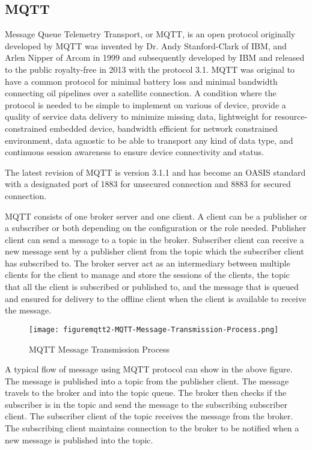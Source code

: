 \subsection{MQTT}
Message Queue Telemetry Transport, or MQTT, is an open protocol originally developed by MQTT was invented by Dr. Andy Stanford-Clark of IBM, and Arlen Nipper of Arcom in 1999 and subsequently developed by IBM and released to the public royalty-free in 2013 with the protocol 3.1. MQTT was original to have a common protocol for minimal battery loss and minimal bandwidth connecting oil pipelines over a satellite connection. A condition where the protocol is needed to be simple to implement on various of device, provide a quality of service data delivery to minimize missing data, lightweight for resource-constrained embedded device, bandwidth efficient for network constrained environment, data agnostic to be able to transport any kind of data type, and continuous session awareness to ensure device connectivity and status\cite{mqtt}.

The latest revision of MQTT is version 3.1.1 and has become an OASIS standard with a designated port of 1883 for unsecured connection and 8883 for secured connection.

MQTT consists of one broker server and one client. A client can be a publisher or a subscriber or both depending on the configuration or the role needed. Publisher client can send a message to a topic in the broker. Subscriber client can receive a new message sent by a publisher client from the topic which the subscriber client has subscribed to. The broker server act as an intermediary between multiple clients for the client to manage and store the sessions of the clients, the topic that all the client is subscribed or published to, and the message that is queued and ensured for delivery to the offline client when the client is available to receive the message. 

\begin{figure}[h]
\centering
\texttt{[image: figuremqtt2-MQTT-Message-Transmission-Process.png]}
\caption{MQTT Message Transmission Process \protect\cite{mqtt}}
\label{fig:mqtt2}
\end{figure}

A typical flow of message using MQTT protocol can show in the above figure. The message is published into a topic from the publisher client. The message travels to the broker and into the topic queue. The broker then checks if the subscriber is in the topic and send the message to the subscribing subscriber client. The subscriber client of the topic receives the message from the broker. The subscribing client maintains connection to the broker to be notified when a new message is published into the topic.

